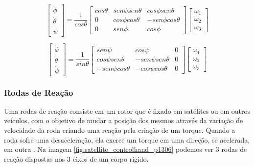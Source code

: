 \begin{equation}
\begin{bmatrix} \dot { \phi  }  \\ \dot { \theta  }  \\ \dot { \psi  }  \end{bmatrix}=\frac { 1 }{ cos\theta  } \begin{bmatrix} cos\theta  & sen\phi sen\theta  & cos\phi sen\theta  \\ 0 & cos\phi cos\theta  & -sen\phi cos\theta  \\ 0 & sen\phi  & cos\phi  \end{bmatrix}\begin{bmatrix} \omega_1 \\ \omega_2  \\ \omega_3  \end{bmatrix} 
\end{equation}

\begin{equation}
\begin{bmatrix} \dot { \phi  }  \\ \dot { \theta  }  \\ \dot { \psi  }  \end{bmatrix}=\frac { 1 }{ sin\theta  } \begin{bmatrix} sen\psi  & cos\psi  & 0 \\ cos\psi sen\theta  & -sen\psi sen\theta  & 0 \\ -sen\psi cos\theta  & -cos\psi cos\theta  & 0 \end{bmatrix}\begin{bmatrix} \omega _{ 1 } \\ \omega _{ 2 } \\ \omega _{ 3 } \end{bmatrix}
\end{equation}


\subsubsection{Rodas de Reação}

Uma rodas de reação consiste em um rotor que é fixado em satélites ou em outros veículos, com o objetivo de mudar a posição dos mesmos através da variação de velocidade da roda criando uma reação pela criação de um torque. Quando a roda sofre uma desaceleração, ela exerce um torque em uma direção, se acelerada, em outra \cite{BongWie2001}. Na imagem \ref{fig:satellite_controlhand_p1306} podemos ver 3 rodas de reação dispostas nos 3 eixos de um corpo rígido.

